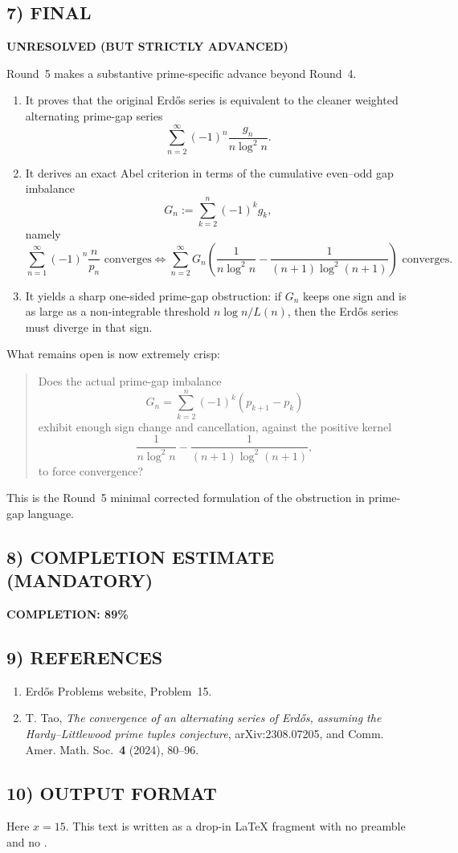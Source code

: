 \subsection*{7) FINAL}

\textbf{UNRESOLVED (BUT STRICTLY ADVANCED)}

Round~5 makes a substantive prime-specific advance beyond Round~4.

\begin{enumerate}
\item It proves that the original Erd\H{o}s series is equivalent to the cleaner weighted alternating prime-gap series
\[
\sum_{n=2}^\infty (-1)^n\frac{g_n}{n\log^2 n}.
\]

\item It derives an exact Abel criterion in terms of the cumulative even--odd gap imbalance
\[
G_n:=\sum_{k=2}^n (-1)^k g_k,
\]
namely
\[
\sum_{n=1}^\infty (-1)^n\frac{n}{p_n}\text{ converges}
\iff
\sum_{n=2}^\infty G_n\left(\frac{1}{n\log^2 n}-\frac{1}{(n+1)\log^2(n+1)}\right)
\text{ converges}.
\]

\item It yields a sharp one-sided prime-gap obstruction: if $G_n$ keeps one sign and is as large as a non-integrable threshold $n\log n/L(n)$, then the Erd\H{o}s series must diverge in that sign.
\end{enumerate}

What remains open is now extremely crisp:
\begin{quote}
Does the actual prime-gap imbalance
\[
G_n=\sum_{k=2}^n (-1)^k(p_{k+1}-p_k)
\]
exhibit enough sign change and cancellation, against the positive kernel
\[
\frac{1}{n\log^2 n}-\frac{1}{(n+1)\log^2(n+1)},
\]
to force convergence?
\end{quote}

This is the Round~5 minimal corrected formulation of the obstruction in prime-gap language.

\subsection*{8) COMPLETION ESTIMATE (MANDATORY)}

\textbf{COMPLETION: 89\%}

\subsection*{9) REFERENCES}

\begin{enumerate}
\item[{[EP]}] Erd\H{o}s Problems website, Problem~15.

\item[{[Ta23]}] T. Tao,
\emph{The convergence of an alternating series of Erd\H{o}s, assuming the Hardy--Littlewood prime tuples conjecture},
arXiv:2308.07205, and Comm. Amer. Math. Soc.\ \textbf{4} (2024), 80--96.
\end{enumerate}

\subsection*{10) OUTPUT FORMAT}

Here $x=15$.
This text is written as a drop-in \LaTeX{} fragment with no preamble and no \verb||.
